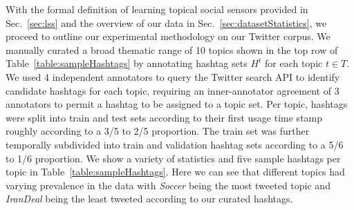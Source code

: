 With the formal definition of learning topical social sensors provided
in Sec.~\ref{sec:lss} and the overview of our data in
Sec.~\ref{sec:datasetStatistics}, we proceed to outline our
experimental methodology on our Twitter corpus.  We manually curated a
broad thematic range of 10 topics shown in the top row of
Table~\ref{table:sampleHashtags}
by annotating hashtag sets $H^t$ for each topic $t \in T$.  We used 4
independent annotators to query the Twitter search API to identify
candidate hashtags for each topic, requiring an inner-annotator
agreement of 3 annotators to permit a hashtag to be assigned to a
topic set.  Per topic, hashtags were split into train and test sets
according to their first usage time stamp roughly according to a 3/5
to 2/5 proportion.  The train set was further temporally subdivided
into train and validation hashtag sets according to a 5/6 to 1/6
proportion.  We show a variety of statistics and five sample hashtags
per topic in Table~\ref{table:sampleHashtags}.  Here we can see that
different topics had varying prevalence in the data
with \textit{Soccer} being the most tweeted topic
and \textit{IranDeal} being the least tweeted according to our curated
hashtags.

